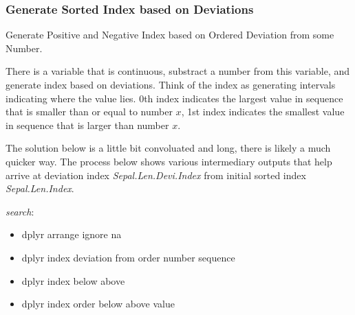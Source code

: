\documentclass[
]{book}
\providecommand{\tightlist}{%
  \setlength{\itemsep}{0pt}\setlength{\parskip}{0pt}}
\begin{document}
\begin{table}[!h]
\centering
{}
\end{table}

\hypertarget{generate-sorted-index-based-on-deviations}{%
\subsubsection{Generate Sorted Index based on Deviations}\label{generate-sorted-index-based-on-deviations}}

Generate Positive and Negative Index based on Ordered Deviation from some Number.

There is a variable that is continuous, substract a number from this variable, and generate index based on deviations. Think of the index as generating intervals indicating where the value lies. 0th index indicates the largest value in sequence that is smaller than or equal to number \(x\), 1st index indicates the smallest value in sequence that is larger than number \(x\).

The solution below is a little bit convoluated and long, there is likely a much quicker way. The process below shows various intermediary outputs that help arrive at deviation index \emph{Sepal.Len.Devi.Index} from initial sorted index \emph{Sepal.Len.Index}.

\emph{search}:

\begin{itemize}
\tightlist
\item
  dplyr arrange ignore na
\item
  dplyr index deviation from order number sequence
\item
  dplyr index below above
\item
  dplyr index order below above value
\end{itemize}
\end{document}
